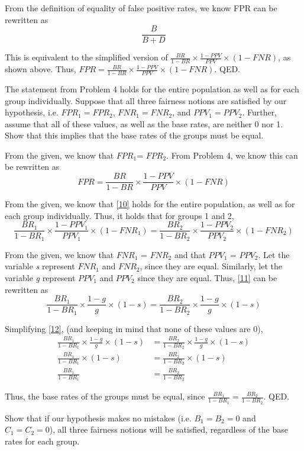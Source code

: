 \documentclass{cisXXX} %
\begin{document}
From the definition of equality of false positive rates, we know FPR can be rewritten as
$$\frac{B}{B+D}$$

This is equivalent to the simplified version of $\frac{BR}{1-BR}\times\frac{1-PPV}{PPV}\times(1 -FNR)$, as shown above. Thus, $FPR = \frac{BR}{1-BR}\times\frac{1-PPV}{PPV}\times(1 -FNR)$. QED.

\HWproblem
The statement from Problem 4 holds for the entire population as well as for each group individually. Suppose that all three fairness notions are satisfied by our hypothesis, i.e. $FPR_1 = FPR_2$, $FNR_1 = FNR_2$, and $PPV_1 = PPV_2$. Further, assume that all of these values, as well as the base rates, are neither 0 nor 1. Show that this implies that the base rates of the groups must be equal.

From the given, we know that $FPR_1 $= $FPR_2$. From Problem 4, we know this can be rewritten as
\begin{equation}
\label{10} FPR = \frac{BR}{1-BR}\times\frac{1-PPV}{PPV}\times(1 -FNR)
\end{equation}

From the given, we know that \eqref{10} holds for the entire population, as well as for each group individually. Thus, it holds that for groups 1 and 2,
\begin{equation}
\label{11} \frac{BR_1}{1-BR_1}\times\frac{1-PPV_1}{PPV_1}\times(1 -FNR_1) = \frac{BR_2}{1-BR_2}\times\frac{1-PPV_2}{PPV_2}\times(1 -FNR_2)
\end{equation}

From the given, we know that $FNR_1$ = $FNR_2$ and that $PPV_1$ = $PPV_2$. Let the variable \textit{s} represent $FNR_1$ and $FNR_2$, since they are equal. Similarly, let the variable \textit{g} represent $PPV_1$ and $PPV_2$ since they are equal. Thus, \eqref{11} can be rewritten as
\begin{equation}
\label{12} \frac{BR_1}{1-BR_1}\times\frac{1-g}{g}\times(1 -s) = \frac{BR_2}{1-BR_2}\times\frac{1-g}{g}\times(1 -s)
\end{equation}

Simplifying \eqref{12}, (and keeping in mind that none of these values are 0),
\begin{align*}
\frac{BR_1}{1-BR_1}\times\frac{1-g}{g}\times(1 -s) &= \frac{BR_2}{1-BR_2}\times\frac{1-g}{g}\times(1 -s)\\
\frac{BR_1}{1-BR_1}\times(1 -s) &= \frac{BR_2}{1-BR_2}\times(1 -s)\\
\frac{BR_1}{1-BR_1} &= \frac{BR_2}{1-BR_2}
\end{align*}

Thus, the base rates of the groups must be equal, since $\frac{BR_1}{1-BR_1} = \frac{BR_2}{1-BR_2}$. QED.

\HWproblem
Show that if our hypothesis makes no mistakes (i.e. $B_1 = B_2 = 0$ and $C_1 = C_2 = 0$), all three fairness notions will be satisfied, regardless of the base rates for each group.
\end{document}
